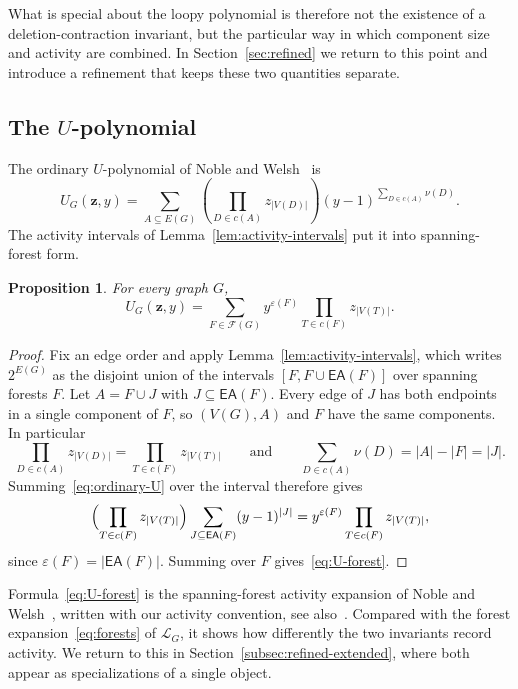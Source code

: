 \documentclass[11pt]{article}
\theoremstyle{plain}
\newtheorem{proposition}[theorem]{Proposition}
\theoremstyle{definition}
\renewcommand{\mathcal}{\mathscr}
\newcommand{\LL}{\mathcal{L}}    %
\newcommand{\cF}{\mathcal{F}}    %
\newcommand{\bz}{\mathbf{z}}
\newcommand{\EA}{\mathsf{EA}} %
\newcommand{\eps}{\varepsilon}
\numberwithin{equation}{section}
\begin{document}
What is special about the loopy polynomial is therefore not the existence
of a deletion-contraction invariant, but the particular way in which component size and activity are combined.
In Section~\ref{sec:refined} we return to this point and introduce a refinement that keeps these two
quantities separate.

\subsection{The  \texorpdfstring{$U$}{U}-polynomial}
\label{subsec:ordinary-U-polychromate}

The ordinary $U$-polynomial of Noble and Welsh~\cite{NW,Nob} is
\begin{equation}\label{eq:ordinary-U}
   U_G(\bz,y)
   =
   \sum_{A\subseteq E(G)}
   \left(\prod_{D\in c(A)}z_{|V(D)|}\right)
   (y-1)^{\sum_{D\in c(A)}\nu(D)}.
\end{equation}
The activity intervals of Lemma~\ref{lem:activity-intervals} put it into
spanning-forest form.

\begin{proposition}\label{prop:U-forest}
For every graph $G$,
\begin{equation}\label{eq:U-forest}
   U_G(\bz,y)
   =
   \sum_{F\in\cF(G)}
   y^{\eps(F)}
   \prod_{T\in c(F)}z_{|V(T)|}.
\end{equation}
\end{proposition}

\begin{proof}
Fix an edge order and apply Lemma~\ref{lem:activity-intervals}, which writes
$2^{E(G)}$ as the disjoint union of the intervals
$[F,F\cup\EA(F)]$ over spanning forests $F$.  Let
$A=F\cup J$ with $J\subseteq\EA(F)$.  Every edge of $J$ has both
endpoints in a single component of $F$, so $(V(G),A)$ and $F$ have the same
components. In particular
\[
  \prod_{D\in c(A)}z_{|V(D)|}=\prod_{T\in c(F)}z_{|V(T)|} \qquad \text{and} \qquad  \sum_{D\in c(A)}\nu(D)=|A|-|F|=|J| .
\]
Summing~\eqref{eq:ordinary-U} over the interval therefore gives
\[
   \Bigl(\prod_{T\in c(F)}z_{|V(T)|}\Bigr)
   \sum_{J\subseteq\EA(F)}(y-1)^{|J|}
   =
   y^{\eps(F)}\prod_{T\in c(F)}z_{|V(T)|},
\]
since $\eps(F)=|\EA(F)|$.  Summing over $F$
gives~\eqref{eq:U-forest}.
\end{proof}

Formula~\eqref{eq:U-forest} is the spanning-forest activity expansion of Noble and Welsh~\cite{NW},
written with our activity convention, see also~\cite{Nob}.
Compared with the forest expansion~\eqref{eq:forests} of $\LL_G$, it shows how differently the two invariants record activity.
We return to this in Section~\ref{subsec:refined-extended}, where both appear as specializations of a single object.
\end{document}
